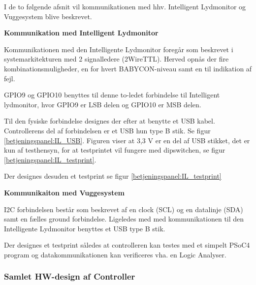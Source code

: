 I de to følgende afsnit vil kommunikationen med hhv. Intelligent Lydmonitor og Vuggesystem blive beskrevet.

\textbf{Kommunikation med Intelligent Lydmonitor}

Kommunikationen med den Intelligente Lydmonitor foregår som beskrevet i systemarkitekturen med 2 signalledere (2WireTTL). Herved opnås der fire kombinationsmuligheder, en for hvert BABYCON-niveau samt en til indikation  af fejl.

GPIO9 og GPIO10 benyttes til denne to-ledet forbindelse til Intelligent lydmonitor, hvor GPIO9 er LSB delen og GPIO10 er MSB delen. 

Til den fysiske forbindelse designes der efter at benytte et USB kabel. Controllerens del af forbindelsen er et USB hun type B stik. Se figur \ref{betjeningspanel:IL_USB}. Figuren viser at 3,3 V er en del af USB stikket, det er kun af testhensyn, for at testprintet vil fungere med dipswitchen, se figur \ref{betjeningspanel:IL_testprint}.

 
Der designes desuden et testprint se figur  \ref{betjeningspanel:IL_testprint}


\textbf{Kommunikaiton med Vuggesystem}

I2C forbindelsen består som beskrevet af en clock (SCL) og en datalinje (SDA) samt en fælles ground forbindelse. Ligeledes med med kommunikationen til den Intelligente Lydmonitor benyttes et USB type B stik.


Der designes et testprint således at controlleren kan testes med et simpelt PSoC4 program og datakommunikationen kan verificeres vha. en Logic Analyser.


\subsubsection*{Samlet HW-design af Controller}

